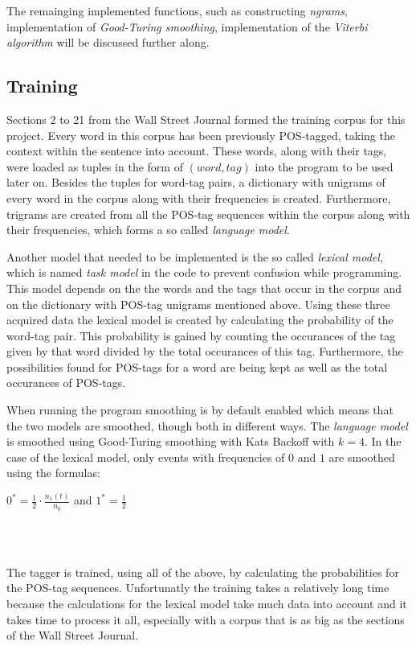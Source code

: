 \documentclass[10pt, a4paper]{article}
\begin{document}
The remainging implemented functions, such as constructing \textit{ngrams}, implementation of \textit{Good-Turing smoothing}, implementation of the \textit{Viterbi algorithm} will be discussed further along.

\subsection*{Training}
Sections 2 to 21 from the Wall Street Journal formed the training corpus for this project. Every word in this corpus has been previously POS-tagged, taking the context within the sentence into account. These words, along with their tags, were loaded as tuples in the form of $(word, tag)$ into the program to be used later on. Besides the tuples for word-tag pairs, a dictionary with unigrams of every word in the corpus along with their frequencies is created. Furthermore, trigrams are created from all the POS-tag sequences within the corpus along with their frequencies, which forms a so called \textit{language model}. 

Another model that needed to be implemented is the so called \textit{lexical model}, which is named \textit{task model} in the code to prevent confusion while programming. This model depends on the the words and the tags that occur in the corpus and on the dictionary with POS-tag unigrams mentioned above. Using these three acquired data the lexical model is created by calculating the probability of the word-tag pair. This probability is gained by counting the occurances of the tag given by that word divided by the total occurances of this tag. Furthermore, the possibilities found for POS-tags for a word are being kept as well as the total occurances of POS-tags.

When running the program smoothing is by default enabled which means that the two models are smoothed, though both in different ways. The \textit{language model} is smoothed using Good-Turing smoothing with Kats Backoff with $k = 4$. In the case of the lexical model, only events with frequencies of $0$ and $1$ are smoothed using the formulas:\\

\centerline{$0^* = \frac{1}{2} \cdot \frac{n_1 (t)}{n_0}$ and $1^* = \frac{1}{2}$}\\\

The tagger is trained, using all of the above, by calculating the probabilities for the POS-tag sequences. Unfortunatly the training takes a relatively long time because the calculations for the lexical model take much data into account and it takes time to process it all, especially with a corpus that is as big as the sections of the Wall Street Journal.
\end{document}
